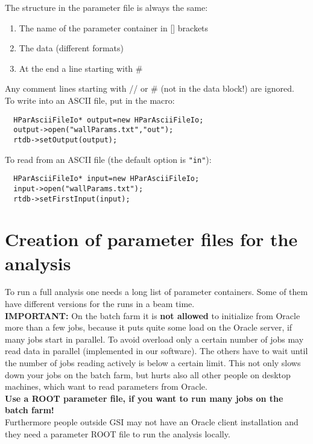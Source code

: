 The structure in the parameter file is always the same:
\begin{enumerate}
 \item The name of the parameter container in [] brackets
 \item The data (different formats)
 \item At the end a line starting with \#
\end{enumerate}
Any comment lines starting with // or \# (not in the data block!) are ignored.\\

To write into an ASCII file, put in the macro:
\begin{lstlisting}
  HParAsciiFileIo* output=new HParAsciiFileIo;
  output->open("wallParams.txt","out");
  rtdb->setOutput(output);
\end{lstlisting}

To read from an ASCII file (the default option is \verb+"in"+):
\begin{lstlisting}
  HParAsciiFileIo* input=new HParAsciiFileIo;
  input->open("wallParams.txt");
  rtdb->setFirstInput(input);
\end{lstlisting}


\section[Creation of parameter files for the analysis]{Creation of parameter files for the analysis}
To run a full analysis one needs a long list of parameter containers. Some of them have different versions for the runs in 
a beam time.\\

\textbf{IMPORTANT:}
On the batch farm it is \textbf{not allowed} to initialize from Oracle more than a few jobs, because it puts quite 
some load on the Oracle server, if many jobs start in parallel. To avoid overload only a certain number of jobs may read 
data in parallel (implemented in our software). The others have to wait until the number of jobs reading actively is 
below a certain limit. This not only slows down your jobs on the batch farm, but hurts also all other people on desktop 
machines, which want to read parameters from Oracle.\\
\textbf{Use a ROOT parameter file, if you want to run many jobs on the batch farm!}\\

Furthermore people outside GSI may not have an Oracle client installation and they need a parameter ROOT file to run the 
analysis locally.


